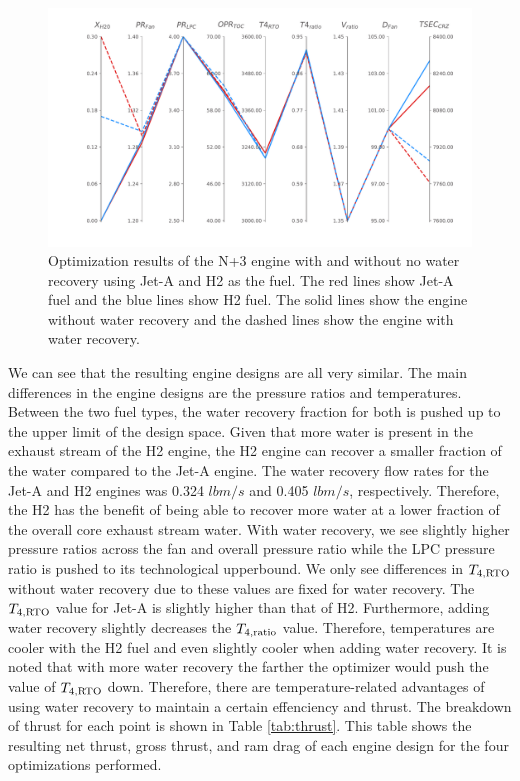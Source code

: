 \documentclass[conf]{new-aiaa}
\begin{document}
\begin{figure}[hbt!]
    \centering
    \includegraphics[width=1.0\textwidth]{N3_parallel_coords.pdf}
    \caption{Optimization results of the N+3 engine with and without no water recovery using Jet-A and H2 as the fuel.
        The red lines show Jet-A fuel and the blue lines show H2 fuel.
        The solid lines show the engine without water recovery and the dashed lines show the engine with water recovery.}
    \label{fig:parallel_coords}
\end{figure}

We can see that the resulting engine designs are all very similar.
The main differences in the engine designs are the pressure ratios and temperatures.
Between the two fuel types, the water recovery fraction for both is pushed up to the upper limit of the design space.
Given that more water is present in the exhaust stream of the H2 engine, the H2 engine can recover a smaller fraction of the water compared to the Jet-A engine.
The water recovery flow rates for the Jet-A and H2 engines was 0.324 $\si{lbm/s}$ and 0.405 $\si{lbm/s}$, respectively.
Therefore, the H2 has the benefit of being able to recover more water at a lower fraction of the overall core exhaust stream water.
With water recovery, we see slightly higher pressure ratios across the fan and overall pressure ratio while the LPC pressure ratio is pushed to its technological upperbound.
We only see differences in $T_{4,\rm{RTO}}$ without water recovery due to these values are fixed for water recovery.
The $T_{4,\rm{RTO}}$ value for Jet-A is slightly higher than that of H2.
Furthermore, adding water recovery slightly decreases the $T_{4,\rm{ratio}}$ value.
Therefore, temperatures are cooler with the H2 fuel and even slightly cooler when adding water recovery.
It is noted that with more water recovery the farther the optimizer would push the value of $T_{4,\rm{RTO}}$ down.
Therefore, there are temperature-related advantages of using water recovery to maintain a certain effenciency and thrust.
The breakdown of thrust for each point is shown in Table \ref{tab:thrust}.
This table shows the resulting net thrust, gross thrust, and ram drag of each engine design for the four optimizations performed.
\end{document}
